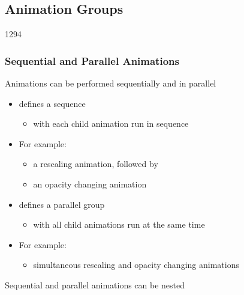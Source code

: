 %
%
%
%

\subsection{Animation Groups}


\begin{slide}{1294}\frametitle{Sequential and Parallel Animations}

Animations can be performed sequentially and in parallel

\begin{itemize}
\item {} defines a sequence
  \begin{itemize}
  \item with each child animation run in sequence
  \end{itemize}

\item For example:
  \begin{itemize}
  \item a rescaling animation, followed by
  \item an opacity changing animation
  \end{itemize}
\end{itemize}

\begin{itemize}
\item {} defines a parallel group
  \begin{itemize}
  \item with all child animations run at the same time
  \end{itemize}

\item For example:
  \begin{itemize}
  \item simultaneous rescaling and opacity changing animations
  \end{itemize}
\end{itemize}

Sequential and parallel animations can be nested

\end{slide}


